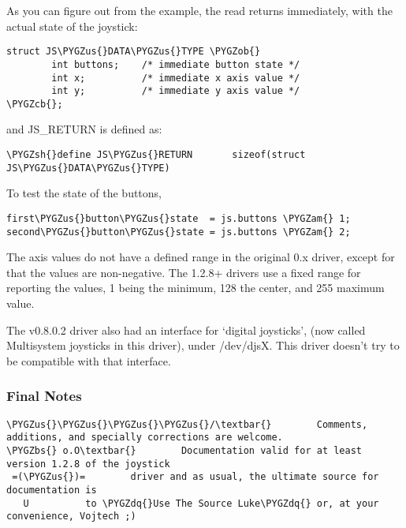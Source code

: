 \documentclass[a4paper,8pt,english]{sphinxmanual}
\def\PYGZbs{\char`\\}
\def\PYGZus{\char`\_}
\def\PYGZob{\char`\{}
\def\PYGZcb{\char`\}}
\def\PYGZam{\char`\&}
\def\PYGZsh{\char`\#}
\def\PYGZdq{\char`\"}
\begin{document}
As you can figure out from the example, the read returns immediately,
with the actual state of the joystick:

\begin{Verbatim}[commandchars=\\\{\}]
struct JS\PYGZus{}DATA\PYGZus{}TYPE \PYGZob{}
        int buttons;    /* immediate button state */
        int x;          /* immediate x axis value */
        int y;          /* immediate y axis value */
\PYGZcb{};
\end{Verbatim}

and JS\_RETURN is defined as:

\begin{Verbatim}[commandchars=\\\{\}]
\PYGZsh{}define JS\PYGZus{}RETURN       sizeof(struct JS\PYGZus{}DATA\PYGZus{}TYPE)
\end{Verbatim}

To test the state of the buttons,

\begin{Verbatim}[commandchars=\\\{\}]
first\PYGZus{}button\PYGZus{}state  = js.buttons \PYGZam{} 1;
second\PYGZus{}button\PYGZus{}state = js.buttons \PYGZam{} 2;
\end{Verbatim}

The axis values do not have a defined range in the original 0.x driver,
except for that the values are non-negative. The 1.2.8+ drivers use a
fixed range for reporting the values, 1 being the minimum, 128 the
center, and 255 maximum value.

The v0.8.0.2 driver also had an interface for `digital joysticks', (now
called Multisystem joysticks in this driver), under /dev/djsX. This driver
doesn't try to be compatible with that interface.


\subsubsection{Final Notes}
\label{input/joydev/joystick-api:final-notes}
\begin{Verbatim}[commandchars=\\\{\}]
\PYGZus{}\PYGZus{}\PYGZus{}\PYGZus{}/\textbar{}        Comments, additions, and specially corrections are welcome.
\PYGZbs{} o.O\textbar{}        Documentation valid for at least version 1.2.8 of the joystick
 =(\PYGZus{})=        driver and as usual, the ultimate source for documentation is
   U          to \PYGZdq{}Use The Source Luke\PYGZdq{} or, at your convenience, Vojtech ;)
\end{Verbatim}
\end{document}
